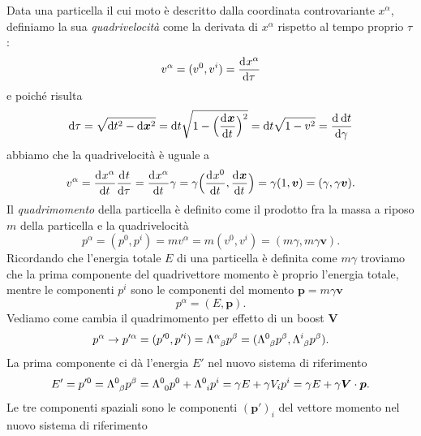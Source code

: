 Data una particella il cui moto è descritto dalla coordinata controvariante
$x^{\alpha}$, definiamo la sua \emph{quadrivelocità} come
la derivata di $x^{\alpha}$ rispetto al tempo proprio $\tau$:
\begin{equation}
  v^{\alpha} = (v^{0}, v^{i}) =\frac{{\mathop{}\!\mathrm{d}^{}}x^{\alpha}}{\mathop{}\!\mathrm{d} {\tau}^{}}
\end{equation}
e poiché risulta
\begin{equation}
  \dd \tau = \sqrt{\dd t^{2} - \dd \bm{x}^{2}} = \dd t \sqrt{1 -
    \Big(\toder{\bm{x}}{t}\Big)^{2}} = \dd t\sqrt{1 - v^{2}} = \toder{\dd
    t}{\gamma}
\end{equation}
abbiamo che la quadrivelocità è uguale a
\begin{equation}
  v^{\alpha} = \toder{x^{\alpha}}{t}\toder{t}{\tau} = \toder{x^{\alpha}}{t}
  \gamma = \gamma \Big(\toder{x^{0}}{t}, \toder{\bm{x}}{t}\Big) =
  \gamma(1,\bm{v}) = (\gamma, \gamma\bm{v}).
\end{equation}
Il \emph{quadrimomento} della particella è definito come il
prodotto fra la massa a riposo $m$ della particella e la quadrivelocità
\begin{equation}
  p^{\alpha} = (p^{0},p^{i}) = m v^{\alpha} = m (v^{0}, v^{i}) = (m\gamma,
  m\gamma\bm{v}).
\end{equation}
Ricordando che l'energia totale $E$ di una particella è definita come $m\gamma$
troviamo che la prima componente del quadrivettore momento è proprio l'energia
totale, mentre le componenti $p^{i}$ sono le componenti del momento
$\bm{p} = m\gamma\bm{v}$
\begin{equation}
  p^{\alpha} = (E, \bm{p}).
\end{equation}
Vediamo come cambia il quadrimomento per effetto di un boost $\bm{V}$
\begin{equation}
  p^{\alpha} \to p'^{\alpha} = (p'^{0}, p'^{i}) =
  \tensor{\Lambda}{^{\alpha}_{\beta}} p^{\beta} =
  (\tensor{\Lambda}{^{0}_{\beta}}p^{\beta},
  \tensor{\Lambda}{^{i}_{\beta}}p^{\beta}).
\end{equation}
La prima componente ci dà l'energia $E'$ nel nuovo sistema di riferimento
\begin{equation}
  E' = p'^{0} = \tensor{\Lambda}{^{0}_{\beta}}p^{\beta} =
  \tensor{\Lambda}{^{0}_{0}}p^{0} + \tensor{\Lambda}{^{0}_{i}}p^{i} = \gamma E +
  \gamma V_{i}p^{i} = \gamma E + \gamma \bm{V}\cdot\bm{p}.
\end{equation}
Le tre componenti spaziali sono le componenti $(\bm{p}')_{i}$ del vettore
momento nel nuovo sistema di riferimento
